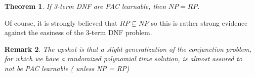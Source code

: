 \documentclass[12pt, letterpaper]{article}
\numberwithin{equation}{section} %
\newtheorem{theorem}{Theorem}[section]
\newtheorem{remark}[theorem]{Remark}
\theoremstyle{definition}
\theoremstyle{remark}
\begin{document}
\begin{theorem}
    If 3-term DNF are PAC learnable, then $NP = RP$.
\end{theorem}

Of course, it is strongly believed that $RP \subsetneq NP$ so this is rather strong evidence against the easiness of the 3-term DNF problem.

\begin{remark}
    The upshot is that a slight generalization of the conjunction problem, for which we have a randomized polynomial time solution, is almost assured to not be PAC learnable ( unless NP = RP)
\end{remark}
\end{document}
